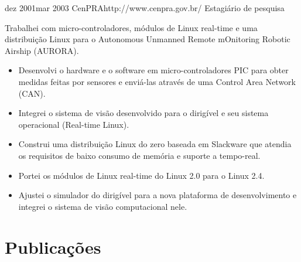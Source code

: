 \documentclass[10pt]{article} %
\begin{document}
\employer
{dez 2001}{mar 2003}
{CenPRA}{http://www.cenpra.gov.br/}
\job
{Estagiário de pesquisa}
{Trabalhei com micro-controladores, módulos de Linux real-time e uma distribuição Linux para o Autonomous Unmanned Remote mOnitoring Robotic Airship (AURORA).

\begin{itemize}
\item{Desenvolvi o hardware e o software em micro-controladores PIC para obter medidas feitas por sensores e enviá-las através de uma Control Area Network (CAN).}
\item{Integrei o sistema de visão desenvolvido para o dirigível e seu sistema operacional (Real-time Linux).}
\item{Construi uma distribuição Linux do zero baseada em Slackware que atendia os requisitos de baixo consumo de memória e suporte a tempo-real.}
\item{Portei os módulos de Linux real-time do Linux 2.0 para o Linux 2.4.}
\item{Ajustei o simulador do dirigível para a nova plataforma de desenvolvimento e integrei o sistema de visão computacional nele.}
\end{itemize}

}


\section{Publicações}
\end{document}
